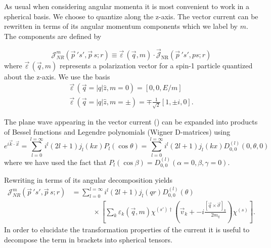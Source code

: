 As usual when considering angular momenta it is most convenient to work in a spherical basis. We choose to quantize along the z-axis. The vector current can be rewritten in terms of its angular momentum components which we label by $m$. The components are defined by

\begin{equation} 
\mathcal{J}^m_{NR}(\vec{p}\,'s',\vec{p}\,s;r)  \equiv \vec{\varepsilon}\,(\vec{q},m) \cdot \vec{\mathcal{J}}_{\mathrm{NR}}(\vec{p}\,'s',ps;r)\label{eqn::hq_vector_current_expansion_ang}
\end{equation}
where $\vec{\varepsilon}\,(\vec{q},m) $ represents a polarization vector for a spin-1 particle quantized about the z-axis. We use the basis 
\begin{gather*}
\vec{\varepsilon}\,(\vec{q} = |q| \hat{z},m=0) = \left[ 0, 0, E/m \right] \\
\vec{\varepsilon}\,(\vec{q}= |q| \hat{z},m=\pm) = \mp \frac{1}{\sqrt{2}}\left[ 1, \pm i , 0 \right].
\end{gather*}

 The plane wave appearing in the vector current () can be expanded into products of Bessel functions and Legendre polynomials (Wigner D-matrices) using    
 \begin{equation*}
e^{i\vec{k}\cdot\vec{x}} = \sum_{l=0}^{l = \infty} i^l (2l+1) j_l(kx) P_l(\cos \theta) =  \sum_{l=0}^{l = \infty} i^l (2l+1) j_l(kx) D^{(l)}_{0,0}(0,\theta,0)
\end{equation*}
where we have used the fact that $P_l(\cos\beta) = D^{(l)}_{0,0}(\alpha=0,\beta,\gamma=0)$.


Rewriting  in terms of its angular decomposition yields 
\begin{align*}
\mathcal{J}^m_{NR}(\vec{p}\,'s',\vec{p}\,s;r) &= \sum_{l=0}^{l = \infty} i^l (2l+1) j_l(qr) D^{(l)}_{0,0}(\theta) \\ 
& \qquad \quad \times \left[ \sum_k \varepsilon_k(\vec{q},m)\chi^{(s')\dagger} \left(   \vec{v}_k+ -i \frac{\left[\vec{q} \times \vec{\sigma} \right]_k}{2m_q} \right) \chi^{(s)} \right]. 
\end{align*}
In order to elucidate the transformation properties of the current it is useful to decompose the term in brackets into spherical tensors. 

